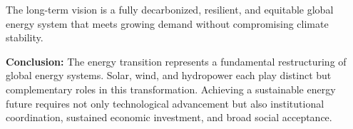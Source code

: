 \documentclass[12pt,a4paper]{article}
\begin{document}
The long-term vision is a fully decarbonized, resilient, and equitable global energy system that meets growing demand without compromising climate stability.

\begin{example}
\textbf{Conclusion:} The energy transition represents a fundamental restructuring of global energy systems. Solar, wind, and hydropower each play distinct but complementary roles in this transformation. Achieving a sustainable energy future requires not only technological advancement but also institutional coordination, sustained economic investment, and broad social acceptance.
\end{example}
\end{document}
